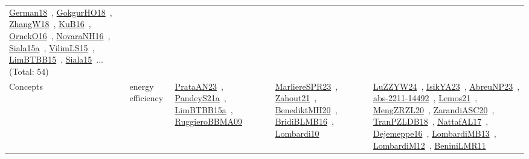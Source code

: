 {\begin{longtable}{lp{3cm}>{\raggedright\arraybackslash}p{6cm}>{\raggedright\arraybackslash}p{6cm}>{\raggedright\arraybackslash}p{8cm}}
\href{../works/German18.pdf}{German18}~\cite{German18}, \href{../works/GokgurHO18.pdf}{GokgurHO18}~\cite{GokgurHO18}, \href{../works/ZhangW18.pdf}{ZhangW18}~\cite{ZhangW18}, \href{../works/KuB16.pdf}{KuB16}~\cite{KuB16}, \href{../works/OrnekO16.pdf}{OrnekO16}~\cite{OrnekO16}, \href{../works/NovaraNH16.pdf}{NovaraNH16}~\cite{NovaraNH16}, \href{../works/Siala15a.pdf}{Siala15a}~\cite{Siala15a}, \href{../works/VilimLS15.pdf}{VilimLS15}~\cite{VilimLS15}, \href{../works/LimBTBB15.pdf}{LimBTBB15}~\cite{LimBTBB15}, \href{../works/Siala15.pdf}{Siala15}~\cite{Siala15}... (Total: 54)\\
\index{energy efficiency}\index{Concepts!energy efficiency}Concepts & energy efficiency & \href{../works/PrataAN23.pdf}{PrataAN23}~\cite{PrataAN23}, \href{../works/PandeyS21a.pdf}{PandeyS21a}~\cite{PandeyS21a}, \href{../works/LimBTBB15a.pdf}{LimBTBB15a}~\cite{LimBTBB15a}, \href{../works/RuggieroBBMA09.pdf}{RuggieroBBMA09}~\cite{RuggieroBBMA09} & \href{../works/MarliereSPR23.pdf}{MarliereSPR23}~\cite{MarliereSPR23}, \href{../works/Zahout21.pdf}{Zahout21}~\cite{Zahout21}, \href{../works/BenediktMH20.pdf}{BenediktMH20}~\cite{BenediktMH20}, \href{../works/BridiBLMB16.pdf}{BridiBLMB16}~\cite{BridiBLMB16}, \href{../works/Lombardi10.pdf}{Lombardi10}~\cite{Lombardi10} & \href{../works/LuZZYW24.pdf}{LuZZYW24}~\cite{LuZZYW24}, \href{../works/IsikYA23.pdf}{IsikYA23}~\cite{IsikYA23}, \href{../works/AbreuNP23.pdf}{AbreuNP23}~\cite{AbreuNP23}, \href{../works/abs-2211-14492.pdf}{abs-2211-14492}~\cite{abs-2211-14492}, \href{../works/Lemos21.pdf}{Lemos21}~\cite{Lemos21}, \href{../works/MengZRZL20.pdf}{MengZRZL20}~\cite{MengZRZL20}, \href{../works/ZarandiASC20.pdf}{ZarandiASC20}~\cite{ZarandiASC20}, \href{../works/TranPZLDB18.pdf}{TranPZLDB18}~\cite{TranPZLDB18}, \href{../works/NattafAL17.pdf}{NattafAL17}~\cite{NattafAL17}, \href{../works/Dejemeppe16.pdf}{Dejemeppe16}~\cite{Dejemeppe16}, \href{../works/LombardiMB13.pdf}{LombardiMB13}~\cite{LombardiMB13}, \href{../works/LombardiM12.pdf}{LombardiM12}~\cite{LombardiM12}, \href{../works/BeniniLMR11.pdf}{BeniniLMR11}~\cite{BeniniLMR11}\\

\end{longtable}}
